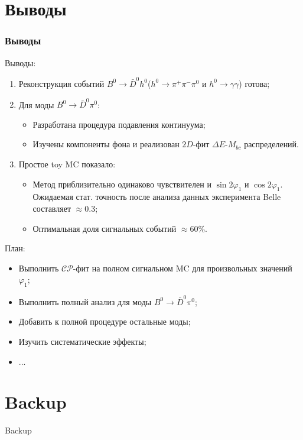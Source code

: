 \documentclass[10 pt,compress,mathserif]{beamer}
\newcommand{\cosbeta}{\ensuremath{\cos{2\varphi_1}}\xspace}
\newcommand{\sinbeta}{\ensuremath{\sin{2\varphi_1}}\xspace}
\newcommand{\cpconj}{\ensuremath{\mathcal{CP}}\xspace}
\newcommand{\bdh}{\ensuremath{B^0\to \bar D^0h^0}\xspace}
\newcommand{\bdpi}{\ensuremath{B^0\to \bar D^0\pi^0}\xspace}
\newcommand{\hgg}{\ensuremath{h^0\to \gamma\gamma}\xspace}
\newcommand{\hppp}{\ensuremath{h^0\to \pi^+\pi^-\pi^0}\xspace}
\begin{document}
\section{Выводы}
\begin{frame}
 \frametitle{Выводы}
 \begin{small}

 Выводы:
 \begin{enumerate}
  \item Реконструкция событий \bdh (\hppp и \hgg) готова;
  \item Для моды \bdpi:
   \begin{itemize}
    \item Разработана процедура подавления континуума;
    \item Изучены компоненты фона и реализован $2D$-фит $\Delta E$-$M_{bc}$ распределений.
   \end{itemize}
  \item Простое toy MC показало:
  \begin{itemize}
   \item Метод приблизительно одинаково чувствителен и \sinbeta и \cosbeta. Ожидаемая стат. точность после анализа данных эксперимента Belle составляет $\approx 0.3$;
   \item Оптимальная доля сигнальных событий $\approx 60 \%$.
  \end{itemize}
 \end{enumerate}

 План:
 \begin{itemize}
  \item Выполнить \cpconj-фит на полном сигнальном MC для произвольных значений $\varphi_1$;
  \item Выполнить полный анализ для моды \bdpi;
  \item Добавить к полной процедуре остальные моды;
  \item Изучить систематические эффекты;
  \item ...
 \end{itemize}
\end{small}
\end{frame}

\appendix
{}
\setcounter{finalframe}{\value{framenumber}}

\section{Backup}
\begin{frame}
 \begin{center}
  \begin{LARGE}
   Backup
  \end{LARGE}
 \end{center}
\end{frame}
\end{document}
